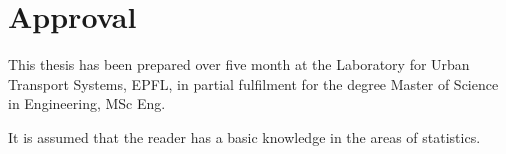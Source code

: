 \section*{Approval}
This thesis has been prepared over five month at the Laboratory for Urban Transport Systems, EPFL, in partial fulfilment for the degree Master of Science in Engineering, MSc Eng. 

It is assumed that the reader has a basic knowledge in the areas of statistics. 

\vfill

\begin{center}
\namesigdate{\thesisauthor~-~\studentnumber}
\end{center}

\vfill


